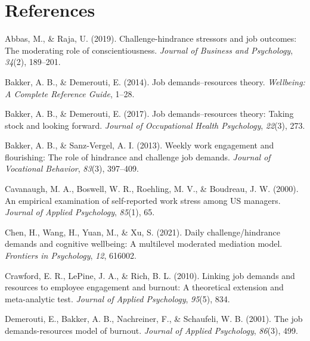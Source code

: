 \documentclass[
  man,mask]{apa6}
\newlength{\cslhangindent}
\newlength{\cslentryspacingunit} %
\newenvironment{CSLReferences}[2] %
 {%
  \setlength{\parindent}{0pt}
  \ifodd #1
  \let\oldpar\par
  \def\par{\hangindent=\cslhangindent\oldpar}
  \fi
  \setlength{\parskip}{#2\cslentryspacingunit}
 }%
 {}
\begin{document}
\newpage

\hypertarget{references}{%
\section{References}\label{references}}

\begingroup
\setlength{\parindent}{-0.5in}
\setlength{\leftskip}{0.5in}

\hypertarget{refs}{}
\begin{CSLReferences}{1}{0}
\leavevmode{}%
Abbas, M., \& Raja, U. (2019). Challenge-hindrance stressors and job outcomes: The moderating role of conscientiousness. \emph{Journal of Business and Psychology}, \emph{34}(2), 189--201.

\leavevmode{}%
Bakker, A. B., \& Demerouti, E. (2014). Job demands--resources theory. \emph{Wellbeing: A Complete Reference Guide}, 1--28.

\leavevmode{}%
Bakker, A. B., \& Demerouti, E. (2017). Job demands--resources theory: Taking stock and looking forward. \emph{Journal of Occupational Health Psychology}, \emph{22}(3), 273.

\leavevmode{}%
Bakker, A. B., \& Sanz-Vergel, A. I. (2013). Weekly work engagement and flourishing: The role of hindrance and challenge job demands. \emph{Journal of Vocational Behavior}, \emph{83}(3), 397--409.

\leavevmode{}%
Cavanaugh, M. A., Boswell, W. R., Roehling, M. V., \& Boudreau, J. W. (2000). An empirical examination of self-reported work stress among US managers. \emph{Journal of Applied Psychology}, \emph{85}(1), 65.

\leavevmode{}%
Chen, H., Wang, H., Yuan, M., \& Xu, S. (2021). Daily challenge/hindrance demands and cognitive wellbeing: A multilevel moderated mediation model. \emph{Frontiers in Psychology}, \emph{12}, 616002.

\leavevmode{}%
Crawford, E. R., LePine, J. A., \& Rich, B. L. (2010). Linking job demands and resources to employee engagement and burnout: A theoretical extension and meta-analytic test. \emph{Journal of Applied Psychology}, \emph{95}(5), 834.

\leavevmode{}%
Demerouti, E., Bakker, A. B., Nachreiner, F., \& Schaufeli, W. B. (2001). The job demands-resources model of burnout. \emph{Journal of Applied Psychology}, \emph{86}(3), 499.


\end{CSLReferences}
\end{document}
